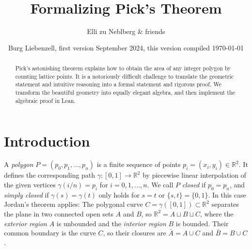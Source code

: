 \documentclass[a4paper]{amsart}
\title{Formalizing Pick's Theorem} %
\author{Elli zu Neblberg \& friends} %
\date{Burg Liebenzell, first version September 2024, this version compiled \today}
\numberwithin{equation}{section}
\theoremstyle{plain}
\theoremstyle{definition}
\newcommand{\R}{\mathbb{R}}
\begin{document}

\begin{abstract}
  Pick's astonishing theorem explains how to obtain %
  the area of any integer polygon by counting lattice points. %
  It is a notoriously difficult challenge %
  to translate the geometric statement and intuitive reasoning
  into a formal statement and rigorous proof. %
  We transform the beautiful geometry into equally elegant algebra,
  and then implement the algebraic proof in Lean.  
\end{abstract}

\maketitle


\section{Introduction} \label{sec:Introduction}




A \emph{polygon} $P = (p_0,p_1,\ldots,p_n)$ is %
a finite sequence of points $p_i = (x_i,y_i) \in \R^2$.
It defines the corresponding path $\gamma \colon [0,1] \to \R^2$
by piecewise linear interpolation of the given vertices
$\gamma(i/n) = p_i$ for $i=0,1,\dots,n$.
We call $P$ \emph{closed} if $p_0 = p_n$, and
\emph{simply closed} if $\gamma(s) = \gamma(t)$
only holds for $s = t$ or $\{s,t\} = \{0,1\}$.
In this case Jordan's theorem applies:
The polygonal curve $C = \gamma([0,1]) \subset \R^2$
separates the plane in two connected open sets $A$ and $B$,
so $\R^2 = A \sqcup B \sqcup C$, where the \emph{exterior region} $A$
is unbounded and the \emph{interior region} $B$ is bounded.
Their common boundary is the curve $C$, so their closures
are $\bar{A} = A \cup C$ and $\bar{B} = B \cup C$.
\end{document}
